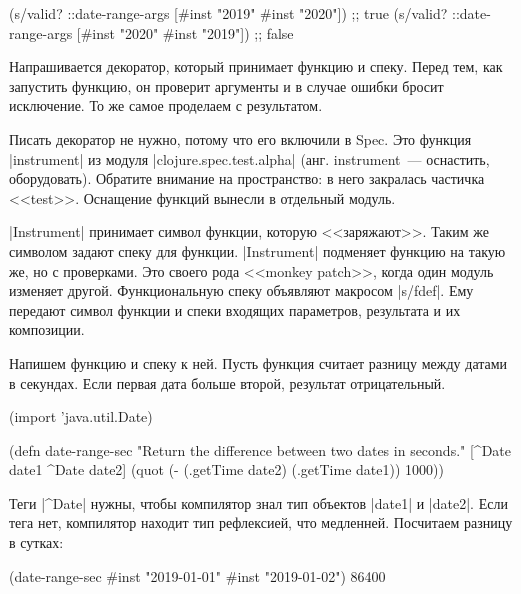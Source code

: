 \begin{english}
  \begin{clojure}
(s/valid? ::date-range-args [#inst "2019" #inst "2020"]) ;; true
(s/valid? ::date-range-args [#inst "2020" #inst "2019"]) ;; false
  \end{clojure}
\end{english}


Напрашивается декоратор, который принимает функцию и спеку. Перед тем, как
запустить функцию, он проверит аргументы и в случае ошибки бросит исключение. То
же самое проделаем с результатом.


Писать декоратор не нужно, потому что его включили в Spec. Это функция
\spverb|instrument| из модуля \spverb|clojure.spec.test.alpha|
(анг. instrument~--- оснастить, оборудовать). Обратите внимание на пространство:
в него закралась частичка <<test>>. Оснащение функций вынесли в отдельный
модуль.

\spverb|Instrument| принимает символ функции, которую <<заряжают>>. Таким же
символом задают спеку для функции. \spverb|Instrument| подменяет функцию на
такую же, но с проверками. Это своего рода <<monkey patch>>, когда один модуль
изменяет другой. Функциональную спеку объявляют макросом \spverb|s/fdef|. Ему
передают символ функции и спеки входящих параметров, результата и их композиции.


Напишем функцию и спеку к ней. Пусть функция считает разницу между датами в
секундах. Если первая дата больше второй, результат отрицательный.

\begin{english}
  \begin{clojure}
(import 'java.util.Date)

(defn date-range-sec
  "Return the difference between two dates in seconds."
  [^Date date1 ^Date date2]
  (quot (- (.getTime date2)
           (.getTime date1))
        1000))
  \end{clojure}
\end{english}

Теги \spverb|^Date| нужны, чтобы компилятор знал тип объектов \spverb|date1| и
\spverb|date2|. Если тега нет, компилятор находит тип рефлексией, что
медленней. Посчитаем разницу в сутках:

\begin{english}
  \begin{clojure}
(date-range-sec #inst "2019-01-01" #inst "2019-01-02")
86400
  \end{clojure}
\end{english}

